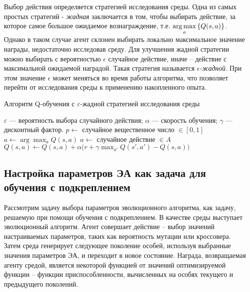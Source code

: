 Выбор действия определяется стратегией исследования среды. Одна из самых простых стратегий - \textit{жадная} заключается в том, чтобы выбирать действие, за которое самое большое ожидаемое вознаграждение, т.е. $\operatorname*{arg\,max}\limits_a{\{Q(s, a)\}}$. Однако в таком случае агент склонен выбирать локально максимальное значение награды, недостаточно исследовав среду. Для улучшения жадной стратегии можно выбирать с вероятностью $\epsilon$ случайное действие, иначе -- действие с максимальной ожидаемой наградой. Такая стратегия называется \textit{$\epsilon$-жадной}. При этом значение $\epsilon$ может меняться во время работы алгоритма, что позволяет перейти от исследования среды к применению накопленного опыта.

\begin{algorithm}[h!]
    \caption{Алгоритм Q-обучения с $\varepsilon$-жадной стратегией исследования среды}
    \label{q_learning}
    \begin{algorithmic}[1]
    \REQUIRE  
        $\varepsilon$ --- вероятность выбора случайного действия;
        $\alpha$ --- скорость обучения;
        $\gamma$ --- дисконтный фактор.
        \STATE $p \gets ${ случайное вещественное число} $\in [0, 1]$
            \STATE $a \gets \arg \max_{a}{Q(s,a)}$
        \ELSE 
            \STATE $a \gets$ { случайное действие } $\in A$
        \ENDIF
        \STATE $Q(s,a) \gets Q(s,a) + \alpha(r + \gamma \max_{a'}{Q(s',a') - Q(s, a))}$
    \ENDWHILE
    \end{algorithmic}
\end{algorithm}

\subsection{Настройка параметров ЭА как задача для обучения с подкреплением}
Рассмотрим задачу выбора параметров эволюционного алгоритма, как задачу, решаемую при помощи обучения с подкреплением. В качестве среды выступает эволюционный алгоритм. Агент совершает действие -- выбор значений настраиваемых параметров, таких как вероятность мутации или кроссовера. Затем среда генерирует следующее поколение особей, используя выбранные значения параметров ЭА, и переходит в новое состояние. Награда, возвращаемая агенту средой, является некоторой функцией от значений оптимизируемой функции -- функции приспособленности, вычисленных на особях текущего и предыдущего поколений.

